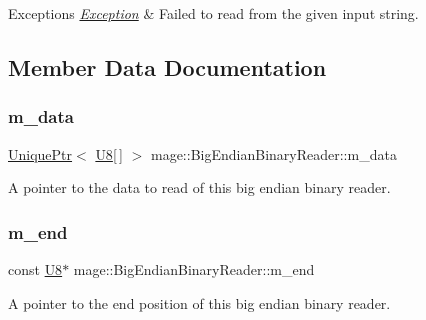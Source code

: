 \begin{DoxyExceptions}{Exceptions}
{\em \mbox{\hyperlink{classmage_1_1_exception}{Exception}}} & Failed to read from the given input string. \\
\hline
\end{DoxyExceptions}


\subsection{Member Data Documentation}
\mbox{\label{classmage_1_1_big_endian_binary_reader_a54128bdaa233c1bd20494189b2397fe3}} 
\subsubsection{\texorpdfstring{m\+\_\+data}{m\_data}}
{\footnotesize\ttfamily \mbox{\hyperlink{namespacemage_a3316d7143a973e37adf1110f2e80ca31}{Unique\+Ptr}}$<$ \mbox{\hyperlink{namespacemage_a30677c03d683c4c35630c25f6ff3fb7f}{U8}}\mbox{[}$\,$\mbox{]} $>$ mage\+::\+Big\+Endian\+Binary\+Reader\+::m\+\_\+data\hspace{0.3cm}{\ttfamily [private]}}

A pointer to the data to read of this big endian binary reader. \mbox{\label{classmage_1_1_big_endian_binary_reader_ab4f707d30799b98afed0f9adfc27a3e2}} 
\subsubsection{\texorpdfstring{m\+\_\+end}{m\_end}}
{\footnotesize\ttfamily const \mbox{\hyperlink{namespacemage_a30677c03d683c4c35630c25f6ff3fb7f}{U8}}$\ast$ mage\+::\+Big\+Endian\+Binary\+Reader\+::m\+\_\+end\hspace{0.3cm}{\ttfamily [private]}}

A pointer to the end position of this big endian binary reader. \mbox{\label{classmage_1_1_big_endian_binary_reader_a4b8ac6558a16e53ee52c8a81b5b43b91}} 
